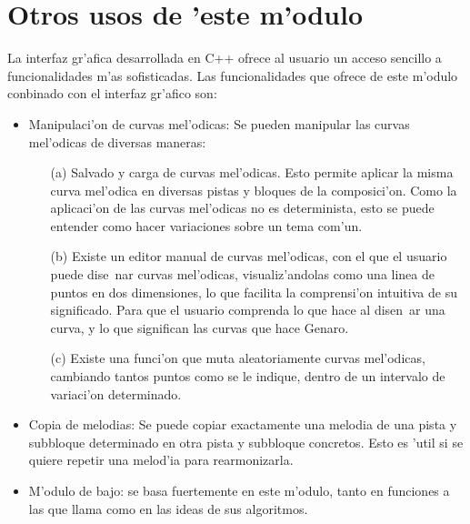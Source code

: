 ﻿\documentclass[a4paper,12pt]{article}
\begin{document}
\section {Otros usos de 'este m'odulo}
La interfaz gr'afica desarrollada en C++ ofrece al usuario un acceso sencillo a funcionalidades m'as sofisticadas. Las funcionalidades que ofrece de este m'odulo conbinado con el interfaz gr'afico son:
	\begin{itemize}
	\item Manipulaci'on de curvas mel'odicas: Se pueden manipular las curvas mel'odicas de diversas maneras:
		\begin{enumerate}
		\item[(a)] Salvado y carga de curvas mel'odicas. Esto permite aplicar la misma curva mel'odica en diversas pistas y bloques de la composici'on. Como la aplicaci'on de las curvas mel'odicas no es determinista, esto se puede entender como hacer variaciones sobre un tema com'un.
		\item[(b)] Existe un editor manual de curvas mel'odicas, con el que el usuario puede dise~nar curvas mel'odicas, visualiz'andolas como una linea de puntos en dos dimensiones, lo que facilita la comprensi'on intuitiva de su significado. Para que el usuario comprenda lo que hace al disen~ar una curva, y lo que significan las curvas que hace Genaro.
		\item[(c)] Existe una funci'on que muta aleatoriamente curvas mel'odicas, cambiando tantos puntos como se le indique, dentro de un intervalo de variaci'on determinado.
	\end{enumerate}
	\item Copia de melodias: Se puede copiar exactamente una melodia de una pista y subbloque determinado en otra pista y subbloque concretos. Esto es 'util si se quiere repetir una melod'ia para rearmonizarla.
	\item M'odulo de bajo: se basa fuertemente en este m'odulo, tanto en funciones a las que llama como en las ideas de sus algoritmos.
	\end{itemize}
\end{document}
